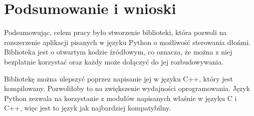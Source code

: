 \chapter{Podsumowanie i wnioski}

\quad Podsumowując, celem pracy było stworzenie biblioteki, która pozwoli na rozszerzenie aplikacji pisanych w języku Python o możliwość sterowania dłońmi. Biblioteka jest o otwartym kodzie źródłowym, co oznacza, że można z niej bezpłatnie korzystać oraz każdy może dołączyć do jej rozbudowywania.  

\quad Bibliotekę można ulepszyć poprzez napisanie jej w języku C++, który jest kompilowany. Pozwoliłoby to na zwiększenie wydajności oprogramowania. Język Python zezwala na korzystanie z modułów napisanych właśnie w języku C i C++, więc jest to język jak najbardziej kompatybilny. 